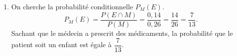 \begin{enumerate}
	$P(E \cap M) = P(E) \times P(M)$.

	D'une part $P(E \cap M) = 0,14$ ; d'autre part
	$P(E) \times P(M) = 0,7 \times 0,26 = 0,182$.

	Comme $0,14 \neq 0,182$, l'égalité n'est pas vérifiée. 

	Les évènements $E$ et $M$ ne sont \textbf{pas indépendants}.


	\item On cherche la probabilité conditionnelle $P_M(E)$.
	\[P_M(E) = \dfrac{P(E \cap M)}{P(M)} = \dfrac{0,14}{0,26} = \dfrac{14}{26} = \dfrac{7}{13}.\]
	Sachant que le médecin a prescrit des médicaments, la probabilité que le patient soit un
	enfant est égale à $\dfrac{7}{13}$.
\end{enumerate}
